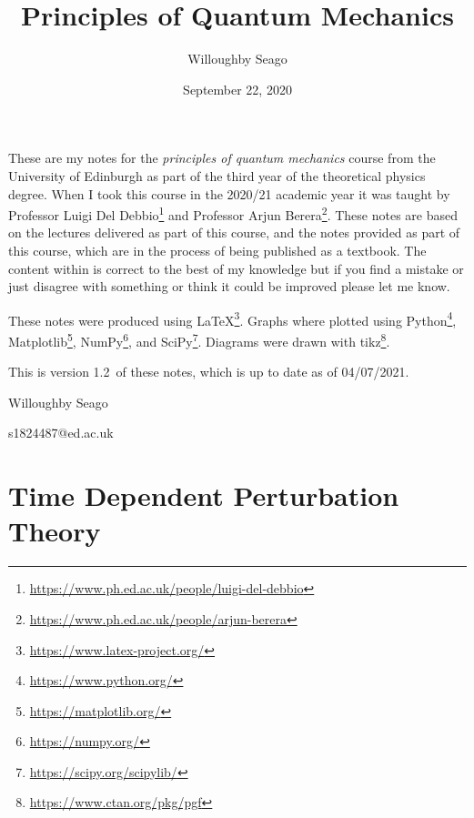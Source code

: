 \documentclass[a4paper]{article}
\author{Willoughby Seago}
\date{September 22, 2020}
\title{Principles of Quantum Mechanics}
\newcommand{\notesVersion}{1.2}
\newcommand{\notesDate}{04/07/2021}
\begin{document}
    \maketitle
    These are my notes for the \textit{principles of quantum mechanics} course from the University of Edinburgh as part of the third year of the theoretical physics degree.
    When I took this course in the 2020/21 academic year it was taught by Professor Luigi Del Debbio\footnote{\url{https://www.ph.ed.ac.uk/people/luigi-del-debbio}} and Professor Arjun Berera\footnote{\url{https://www.ph.ed.ac.uk/people/arjun-berera}}.
    These notes are based on the lectures delivered as part of this course, and the notes provided as part of this course, which are in the process of being published as a textbook.
    The content within is correct to the best of my knowledge but if you find a mistake or just disagree with something or think it could be improved please let me know.
    
    These notes were produced using \LaTeX\footnote{\url{https://www.latex-project.org/}}.
    Graphs where plotted using Python\footnote{\url{https://www.python.org/}}, Matplotlib\footnote{\url{https://matplotlib.org/}}, NumPy\footnote{\url{https://numpy.org/}}, and SciPy\footnote{\url{https://scipy.org/scipylib/}}.
    Diagrams were drawn with tikz\footnote{\url{https://www.ctan.org/pkg/pgf}}.
    
    This is version \notesVersion~of these notes, which is up to date as of \notesDate.
    \begin{flushright}
        Willoughby Seago
        
        s1824487@ed.ac.uk
    \end{flushright}
    \clearpage
    \tableofcontents
    \listoffigures
    \listoftables
    \printglossary[type=\acronymtype, title=Acronyms, style=long]
    \clearpage
    \begingroup
    \let\clearpage\relax  %
    
    
    
    
    
    
    
    \endgroup
    
    \part{Time Dependent Perturbation Theory}
\end{document}
